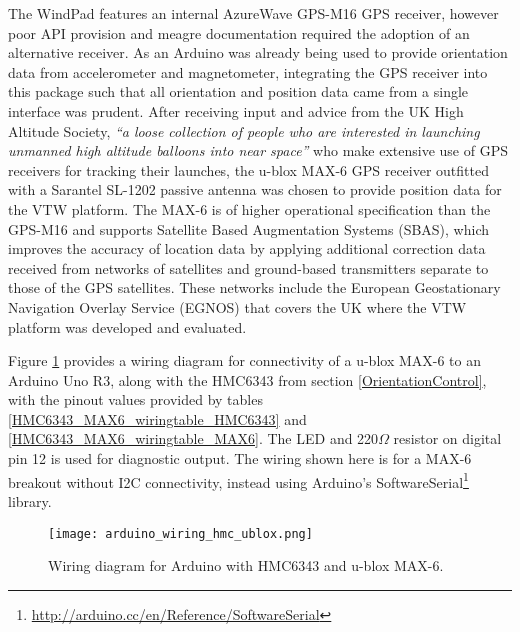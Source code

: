 \newcommand{\softwareserialFootnote}{\footnote{\url{http://arduino.cc/en/Reference/SoftwareSerial}}}

\newcommand{\maxProtocolFootnote}{\footnote{\url{https://u-blox.com/images/downloads/Product_Docs/u-blox6_ReceiverDescriptionProtocolSpec_(GPS.G6-SW-10018).pdf}}}

\newcommand{\tinygpsFootnote}{\footnote{\url{http://arduiniana.org/libraries/tinygps/}}}


The WindPad features an internal AzureWave GPS-M16 GPS receiver\azurewaveFootnote{}, however poor API provision and meagre documentation required the adoption of an alternative receiver. As an Arduino was already being used to provide orientation data from accelerometer and magnetometer, integrating the GPS receiver into this package such that all orientation and position data came from a single interface was prudent. After receiving input and advice from the UK High Altitude Society\habFootnote{}, \textit{``a loose collection of people who are interested in launching unmanned high altitude balloons into near space''} who make extensive use of GPS receivers for tracking their launches, the u-blox MAX-6\ubloxFootnote{} GPS receiver outfitted with a Sarantel SL-1202\sarantelFootnote{} passive antenna was chosen to provide position data for the VTW platform. The MAX-6 is of higher operational specification than the GPS-M16 and supports Satellite Based Augmentation Systems (SBAS), which improves the accuracy of location data by applying additional correction data received from networks of satellites and ground-based transmitters separate to those of the GPS satellites. These networks include the European Geostationary Navigation Overlay Service (EGNOS) that covers the UK where the VTW platform was developed and evaluated.

Figure \ref{arduino_wiring_hmc_ublox.png} provides a wiring diagram for connectivity of a u-blox MAX-6 to an Arduino Uno R3, along with the HMC6343 from section \ref{OrientationControl}, with the pinout values provided by tables \ref{HMC6343_MAX6_wiringtable_HMC6343} and \ref{HMC6343_MAX6_wiringtable_MAX6}. The LED and 220$\Omega$ resistor on digital pin 12 is used for diagnostic output. The wiring shown here is for a MAX-6 breakout without I2C connectivity, instead using Arduino's SoftwareSerial\softwareserialFootnote{} library.

\begin{figure}[h]
\centering
  \texttt{[image: arduino\_wiring\_hmc\_ublox.png]}
  \caption{Wiring diagram for Arduino with HMC6343 and u-blox MAX-6.}
  \label{arduino_wiring_hmc_ublox.png}
\end{figure}

